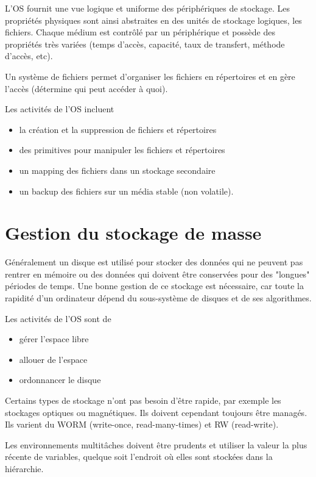 L'OS fournit une vue logique et uniforme des périphériques de stockage. Les propriétés physiques sont ainsi abstraites en des unités de stockage logiques, les fichiers. Chaque médium est contrôlé par un périphérique et possède des propriétés très variées (temps d'accès, capacité, taux de transfert, méthode d'accès, etc).

Un système de fichiers permet d'organiser les fichiers en répertoires et en gère l'accès (détermine qui peut accéder à quoi).

Les activités de l'OS incluent

\begin{itemize}
	\item la création et la suppression de fichiers et répertoires
	\item des primitives pour manipuler les fichiers et répertoires
	\item un mapping des fichiers dans un stockage secondaire
	\item un backup des fichiers sur un média stable (non volatile).
\end{itemize}

\section{Gestion du stockage de masse}

Généralement un disque est utilisé pour stocker des données qui ne peuvent pas rentrer en mémoire ou des données qui doivent être conservées pour des "longues" périodes de temps. Une bonne gestion de ce stockage est nécessaire, car toute la rapidité d'un ordinateur dépend du sous-système de disques et de ses algorithmes.

Les activités de l'OS sont de

\begin{itemize}
	\item gérer l'espace libre
	\item allouer de l'espace
	\item ordonnancer le disque
\end{itemize}

Certains types de stockage n'ont pas besoin d'être rapide, par exemple les stockages optiques ou magnétiques. Ils doivent cependant toujours être managés. Ils varient du WORM (write-once, read-many-times) et RW (read-write).


Les environnements multitâches doivent être prudents et utiliser la valeur la plus récente de variables, quelque soit l'endroit où elles sont stockées dans la hiérarchie.


